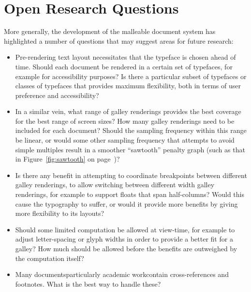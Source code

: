 \section{Open Research Questions}

More generally, the development of the malleable document system has highlighted a number of questions that may suggest areas for future research:

\begin{itemize}
 \item Pre-rendering text layout necessitates that the typeface is chosen ahead of time. Should each document be rendered in a certain set of typefaces, for example for accessibility purposes? Is there a particular subset of typefaces or classes of typefaces that provides maximum flexibility, both in terms of user preference and accessibility?

\item In a similar vein, what range of galley renderings provides the best coverage for the best range of screen sizes? How many galley renderings need to be included for each document? Should the sampling frequency within this range be linear, or would some other sampling frequency that attempts to avoid simple multiples result in a smoother ``sawtooth'' penalty graph (such as that in Figure~\ref{fig:sawtooth} on page~\pageref{fig:sawtooth})?

\item Is there any benefit in attempting to coordinate breakpoints between different galley renderings, to allow switching between different width galley renderings, for example to support floats that span half-columns? Would this cause the typography to suffer, or would it provide more benefits by giving more flexibility to its layouts?

\item Should some limited computation be allowed at view-time, for example to adjust letter-spacing or glyph widths in order to provide a better fit for a galley? How much should be allowed before the benefits are outweighed by the computation itself?

\item Many documents\ed particularly academic work\ed contain cross-references and footnotes. What is the best way to handle these?%

\end{itemize}





